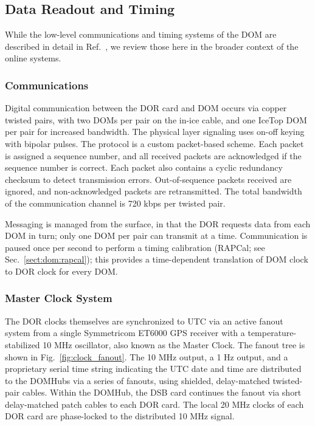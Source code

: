 \subsection{Data Readout and Timing}

While the low-level communications and timing systems of the DOM are
described in detail in Ref.~\cite{ICECUBE:DAQ}, we review those here in
the broader context of the online systems.

\subsubsection{\label{sect:online:comms}Communications}

Digital communication between the DOR card and DOM occurs via copper
twisted pairs, with two DOMs per pair on the in-ice cable, and one IceTop
DOM per pair for increased bandwidth.  The physical layer signaling
uses on-off keying with bipolar pulses.  The protocol is a custom
packet-based scheme.  Each packet is assigned a sequence number, and all
received packets are acknowledged if the sequence number is correct.  Each
packet also contains a cyclic redundancy checksum to detect transmission errors.
Out-of-sequence packets received are ignored, and non-acknowledged packets
are retransmitted. The total bandwidth of the communication channel
is 720 kbps per twisted pair.

Messaging is managed from the surface, in that the DOR requests data from
each DOM in turn; only one DOM per pair can transmit at a time.  Communication is
paused once per second to perform a timing calibration (RAPCal; see
Sec.~\ref{sect:dom:rapcal}); this provides a time-dependent translation of DOM clock to DOR
clock for every DOM.  


\subsubsection{\label{sect:online:master_clock}Master Clock System}

The DOR clocks themselves are synchronized to UTC via an active fanout
system from a single Symmetricom ET6000 GPS receiver with a
temperature-stabilized 10 MHz oscillator, also known as the Master
Clock. The fanout tree is shown in
Fig.~\ref{fig:clock_fanout}. The 10 MHz output, a 1 Hz output, and a
proprietary serial time string indicating
the UTC date and time are distributed to the DOMHubs via a series of
fanouts, using shielded, delay-matched twisted-pair cables.  Within the
DOMHub, the DSB card continues the fanout via short delay-matched patch
cables to each DOR card.  The local 20 MHz clocks of each DOR card are
phase-locked to the distributed 10 MHz signal.  

